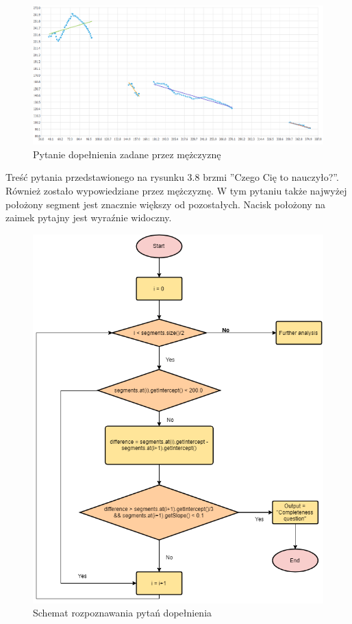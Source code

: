 \documentclass[a4paper,12 pt]{report}
\begin{document}
 \FloatBarrier
\begin{figure}[h]
\centering
\includegraphics[scale=0.80]{pytanie_dopelnienia_2.pdf}
\caption{Pytanie dopełnienia zadane przez mężczyznę}
\end{figure}
\FloatBarrier
Treść pytania przedstawionego na rysunku 3.8 brzmi ''Czego Cię to nauczyło?''. Również zostało wypowiedziane przez mężczyznę. W tym pytaniu także najwyżej położony segment jest znacznie większy od pozostałych. Nacisk położony na zaimek pytajny jest wyraźnie widoczny.
 \FloatBarrier
\begin{figure}[h]
\centering
\includegraphics[scale=0.85]{completeness.png}
\caption{Schemat rozpoznawania pytań dopełnienia}
\end{figure}
\end{document}
